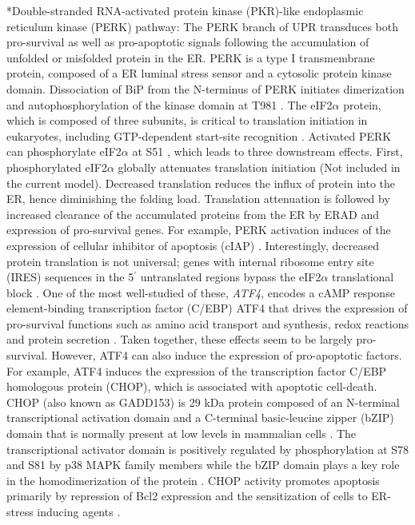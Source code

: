 \documentclass[12pt]{article}
\makeatletter
\renewcommand\subsection{\@startsection
	{subsection}{2}{0mm}
	{-0.05in}
	{-0.5\baselineskip}
	{\normalfont\normalsize\bfseries}}
\makeatother
\begin{document}
\subsection*{Double-stranded RNA-activated protein kinase (PKR)-like endoplasmic reticulum kinase (PERK) pathway:} The PERK branch of UPR transduces both pro-survival as well as pro-apoptotic signals following the accumulation of unfolded or misfolded protein in the ER. PERK is a type I transmembrane protein, composed of a ER luminal stress sensor and a cytosolic protein kinase domain. Dissociation of BiP from the N-terminus of PERK initiates dimerization and autophosphorylation of the kinase domain at T981 \citep{Kebache:2004kx}. The eIF2$\alpha$ protein, which is composed of three subunits, is critical to translation initiation in eukaryotes, including GTP-dependent start-site recognition \citep{Merrick:2004lr}. Activated PERK can phosphorylate eIF2$\alpha$ at S51 \citep{harding1999pta,Raven:2008fu}, which leads to three downstream effects. First, phosphorylated eIF2$\alpha$ globally attenuates translation initiation (Not included in the current model). Decreased translation reduces the influx of protein into the ER, hence diminishing the folding load. Translation attenuation is followed by increased clearance of the accumulated proteins from the ER by ERAD and expression of pro-survival genes. For example, PERK activation induces of the expression of cellular inhibitor of apoptosis (cIAP) \citep{hamanaka2008pdr}. Interestingly, decreased protein translation is not universal; genes with internal ribosome entry site (IRES) sequences in the 5$^{\prime}$ untranslated regions bypass the eIF2$\alpha$ translational block \citep{Schroder:2005vn}. One of the most well-studied of these, \emph{ATF4}, encodes a cAMP response element-binding transcription factor (C/EBP) \citep{lu2004tra} ATF4 that drives the expression of pro-survival functions such as amino acid transport and synthesis, redox reactions and protein secretion \citep{harding2003isr}. Taken together, these effects seem to be largely pro-survival. However, ATF4 can also induce the expression of pro-apoptotic factors. For example, ATF4 induces the expression of the transcription factor C/EBP homologous protein (CHOP), which is associated with apoptotic cell-death. CHOP (also known as GADD153) is 29 kDa protein composed of an N-terminal transcriptional activation domain and a C-terminal basic-leucine zipper (bZIP) domain that is normally present at low levels in mammalian cells \citep{ron1992cnd}. The transcriptional activator domain is positively regulated by phosphorylation at S78 and S81 by p38 MAPK family members \citep{wang272sip,maytin2001sit} while the bZIP domain plays a key role in the homodimerization of the protein \citep{matsumoto1996eec,maytin2001sit}. CHOP activity promotes apoptosis primarily by repression of Bcl2 expression and the sensitization of cells to ER-stress inducing agents \citep{gotoh:hdc,mccullough2001gsc}. 
\end{document}
